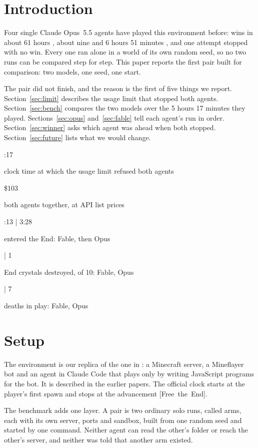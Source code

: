 \documentclass[11pt,a4paper]{article}
\newcommand{\statcell}[2]{%
  \begin{minipage}[t]{0.177\textwidth}\raggedright
    {\sffamily\fontsize{17}{20}\selectfont #1\par}\vspace{3pt}
    {\sffamily\fontsize{7}{8.6}\selectfont\color{inkgrey}#2\par}
  \end{minipage}}
\newcommand{\statsep}{\hspace{0.5em}{\color{rulegrey}\vrule width 0.6pt}\hspace{0.6em}}
\newcommand{\adv}[1]{\mbox{\textsf{[#1]}}}
\begin{document}
\clearpage
\section{Introduction}

Four single Claude Opus~5.5 agents have played this environment before: wins in about 61 hours \citep{batsuk2026single}, about nine \citep{batsuk2026second} and 6 hours 51 minutes \citep{batsuk2026fourth}, and one attempt stopped with no win. Every one ran alone in a world of its own random seed, so no two runs can be compared step for step. This paper reports the first pair built for comparison: two models, one seed, one start.

The pair did not finish, and the reason is the first of five things we report. Section~\ref{sec:limit} describes the usage limit that stopped both agents. Section~\ref{sec:bench} compares the two models over the 5 hours 17 minutes they played. Sections~\ref{sec:opus} and~\ref{sec:fable} tell each agent's run in order. Section~\ref{sec:winner} asks which agent was ahead when both stopped. Section~\ref{sec:future} lists what we would change.

\vspace{10pt}
\noindent
\statcell{5:17}{clock time at which the usage limit refused both agents}\statsep
\statcell{\$103}{both agents together, at API list prices}\statsep
\statcell{3:13 \textcolor{inkgrey}{|} 3:28}{entered the End: Fable, then Opus}\statsep
\statcell{6 \textcolor{inkgrey}{|} 1}{End crystals destroyed, of 10: Fable, Opus}\statsep
\statcell{11 \textcolor{inkgrey}{|} 7}{deaths in play: Fable, Opus}

\section{Setup}
\label{sec:setup}

The environment is our replica of the one in \citet{faldor2026team}: a Minecraft server, a Mineflayer bot \citep{mineflayer} and an agent in Claude Code \citep{claudecode} that plays only by writing JavaScript programs for the bot. It is described in the earlier papers. The official clock starts at the player's first spawn and stops at the advancement \adv{Free the End}.

The benchmark adds one layer. A pair is two ordinary solo runs, called arms, each with its own server, ports and sandbox, built from one random seed and started by one command. Neither agent can read the other's folder or reach the other's server, and neither was told that another arm existed.
\end{document}
